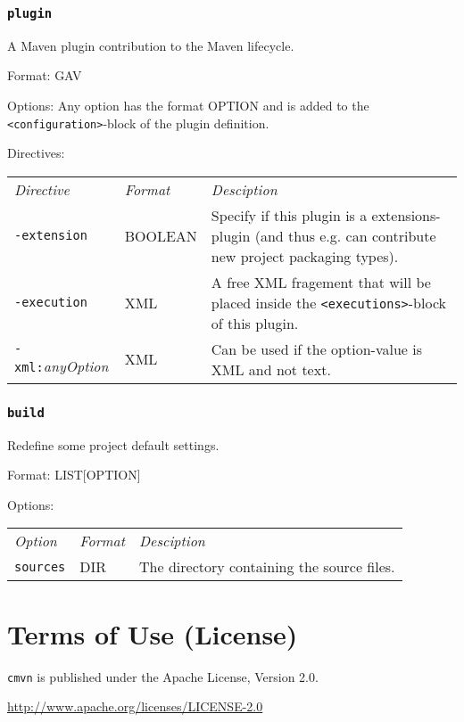 \documentclass[a4paper,12pt,english,oneside,halfparskip]{scrartcl}
\newcommand{\CMVN}{\texttt{cmvn}}
\newcommand{\code}[1]{\texttt{#1}}
\begin{document}
\subsubsection{\code{plugin}}

A Maven plugin contribution to the Maven lifecycle.

Format: GAV

Options: Any option has the format OPTION and is added to the \code{<configuration>}-block of the plugin definition.


Directives: 

\begin{tabular}{llp{}}
\emph{Directive} & \emph{Format} & \emph{Desciption} \\
\code{-extension} & BOOLEAN & Specify if this plugin is a extensions-plugin (and thus e.g. can contribute new project packaging types). \\
\code{-execution} & XML & A free XML fragement that will be placed inside the \code{<executions>}-block of this plugin. \\
\code{-xml:}\emph{anyOption} & XML & Can be used if the option-value is XML and not text. \\
\end{tabular}



\subsubsection{\code{build}}

Redefine some project default settings.

Format: LIST[OPTION]

Options:

\begin{tabular}{llp{}}
\emph{Option} & \emph{Format} & \emph{Desciption} \\
\code{sources} &  DIR & The directory containing the source files. \\
\end{tabular}





\section{Terms of Use (License)}

\CMVN{} is published under the Apache License, Version 2.0.

\url{http://www.apache.org/licenses/LICENSE-2.0}
\end{document}

